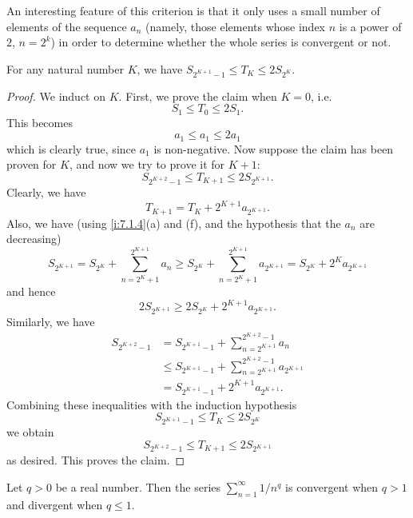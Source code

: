 \begin{rmk}\label{i:7.3.5}
  An interesting feature of this criterion is that it only uses a small number of elements of the sequence \(a_n\)
  (namely, those elements whose index \(n\) is a power of \(2\), \(n = 2^k\))
  in order to determine whether the whole series is convergent or not.
\end{rmk}

\begin{lem}\label{i:7.3.6}
  For any natural number \(K\), we have \(S_{2^{K + 1} - 1} \leq T_K \leq 2S_{2^K}\).
\end{lem}

\begin{proof}
  We induct on \(K\).
  First, we prove the claim when \(K = 0\), i.e.
  \[
    S_1 \leq T_0 \leq 2S_1.
  \]
  This becomes
  \[
    a_1 \leq a_1 \leq 2a_1
  \]
  which is clearly true, since \(a_1\) is non-negative.
  Now suppose the claim has been proven for \(K\), and now we try to prove it for \(K + 1\):
  \[
    S_{2^{K + 2} - 1} \leq T_{K + 1} \leq 2S_{2^{K + 1}}.
  \]
  Clearly, we have
  \[
    T_{K + 1} = T_K + 2^{K + 1} a_{2^{K + 1}}.
  \]
  Also, we have
  (using \cref{i:7.1.4}(a) and (f), and the hypothesis that the \(a_n\) are decreasing)
  \[
    S_{2^{K + 1}} = S_{2^K} + \sum_{n = 2^K + 1}^{2^{K + 1}} a_n \geq S_{2^K} + \sum_{n = 2^K + 1}^{2^{K + 1}} a_{2^{K + 1}} = S_{2^K} + 2^K a_{2^{K + 1}}
  \]
  and hence
  \[
    2S_{2^{K + 1}} \geq 2S_{2^K} + 2^{K + 1} a_{2^{K + 1}}.
  \]
  Similarly, we have
  \begin{align*}
    S_{2^{K + 2} - 1} & = S_{2^{K + 1} - 1} + \sum_{n = 2^{K + 1}}^{2^{K + 2} - 1} a_n              \\
                      & \leq S_{2^{K + 1} - 1} + \sum_{n = 2^{K + 1}}^{2^{K + 2} - 1} a_{2^{K + 1}} \\
                      & = S_{2^{K + 1} - 1} + 2^{K + 1} a_{2^{K + 1}}.
  \end{align*}
  Combining these inequalities with the induction hypothesis
  \[
    S_{2^{K + 1} - 1} \leq T_K \leq 2S_{2^K}
  \]
  we obtain
  \[
    S_{2^{K + 2} - 1} \leq T_{K + 1} \leq 2S_{2^{K + 1}}
  \]
  as desired.
  This proves the claim.
\end{proof}

\begin{cor}\label{i:7.3.7}
  Let \(q > 0\) be a real number.
  Then the series \(\sum_{n = 1}^\infty 1 / n^q\) is convergent when \(q > 1\) and divergent when \(q \leq 1\).
\end{cor}

